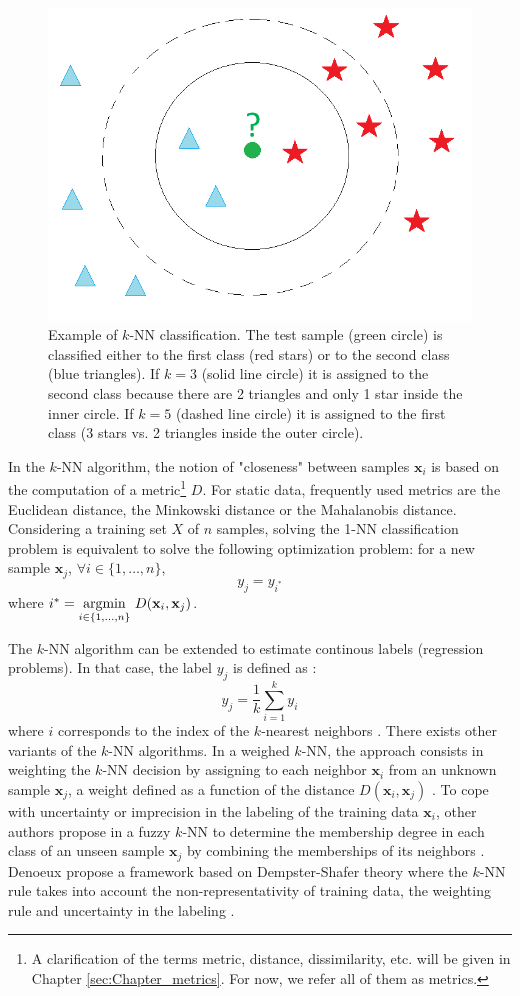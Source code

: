 \begin{figure}[h!]
\centering
\includegraphics[width=0.40\linewidth]{images/kNN_example}
\caption{Example of $k$-NN classification. The test sample (green circle) is classified either to the first class (red stars) or to the second class (blue triangles). If $k = 3$ (solid line circle) it is assigned to the second class because there are 2 triangles and only 1 star inside the inner circle. If $k = 5$ (dashed line circle) it is assigned to the first class (3 stars vs. 2 triangles inside the outer circle).}
\label{fig:kNN_example}
\end{figure}

\indent In the $k$-NN algorithm, the notion of "closeness" between samples $\textbf{x}_i$ is based on the computation of a metric\footnote{A clarification of the terms metric, distance, dissimilarity, etc. will be given in Chapter \ref{sec:Chapter_metrics}. For now, we refer all of them as metrics.} $D$. For static data, frequently used metrics are the Euclidean distance, the Minkowski distance or the Mahalanobis distance. Considering a training set $X$ of $n$ samples, solving the 1-NN classification problem is equivalent to solve the following optimization problem: for a new sample $\textbf{x}_j$, $\forall i \in \{1,\ldots,n\}$,
\begin{equation}
y_j = y_{i^*}
\end{equation}
where $i^*={\underset{i \in \{1,\ldots,n\}}{\argmin}  \text{ } D(\textbf{x}_i,\textbf{x}_j)}$.

The $k$-NN algorithm can be extended to estimate continous labels (regression problems). In that case, the label $y_j$ is defined as :
\begin{equation}
y_j = \frac{1}{k}\sum_{i=1}^{k} y_{i}
\end{equation}
where $i$ corresponds to the index of the $k$-nearest neighbors \cite{Altman1992}. There exists other variants of the $k$-NN algorithms. In a weighed $k$-NN, the approach consists in weighting the $k$-NN decision by assigning to each neighbor $\textbf{x}_i$ from an unknown sample $\textbf{x}_j$, a weight defined as a function of the distance $D(\textbf{x}_i, \textbf{x}_j)$ \cite{Dudani1976}. To cope with uncertainty or imprecision in the labeling of the training data $\textbf{x}_i$, other authors propose in a fuzzy $k$-NN to determine the membership degree in each class of an unseen sample $\textbf{x}_j$ by combining the memberships of its neighbors \cite{Keller1985}.  Denoeux propose a framework based on Dempster-Shafer theory where the $k$-NN rule takes into account the non-representativity of training data, the weighting rule and uncertainty in the labeling \cite{Denoeux1995}.

